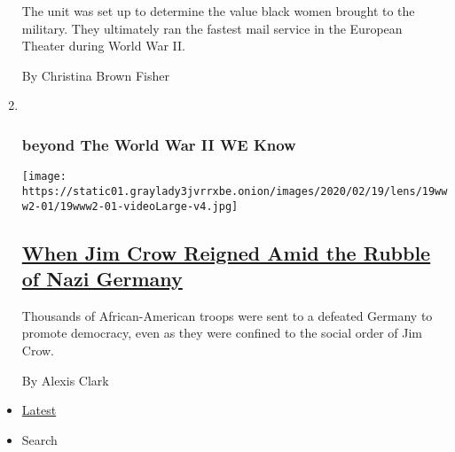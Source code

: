 \begin{enumerate}
  The unit was set up to determine the value black women brought to the
  military. They ultimately ran the fastest mail service in the European
  Theater during World War II.

  By Christina Brown Fisher
\item ~
  \hypertarget{beyond-the-world-war-ii-we-know-6}{%
  \subsubsection{beyond The World War II WE
  Know}\label{beyond-the-world-war-ii-we-know-6}}

  \texttt{[image: https://static01.graylady3jvrrxbe.onion/images/2020/02/19/lens/19www2-01/19www2-01-videoLarge-v4.jpg]}

  \hypertarget{when-jim-crow-reigned-amid-the-rubble-of-nazi-germany}{%
  \subsection{\texorpdfstring{\href{/2020/02/19/magazine/blacks-wwii-racism-germany.html}{When
  Jim Crow Reigned Amid the Rubble of Nazi
  Germany}}{When Jim Crow Reigned Amid the Rubble of Nazi Germany}}\label{when-jim-crow-reigned-amid-the-rubble-of-nazi-germany}}

  Thousands of African-American troops were sent to a defeated Germany
  to promote democracy, even as they were confined to the social order
  of Jim Crow.

  By Alexis Clark
\end{enumerate}

\begin{itemize}
\tightlist
\item
  \protect\hyperlink{stream-panel}{Latest}
\item
  Search
\end{itemize}

